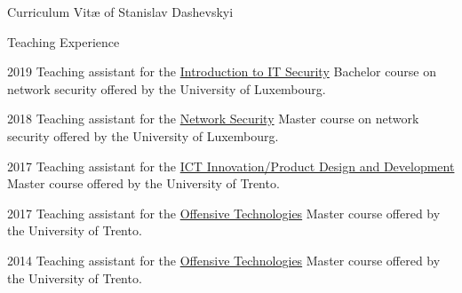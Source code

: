 \documentclass[11pt]{custom-style}
\begin{document}
\begin{cv}{Curriculum Vit\ae{} of Stanislav Dashevskyi}
\begin{cvlist}{Teaching Experience}
       \item[2019] Teaching assistant for the \href{http://satoss.uni.lu/courses/sec-intro/}{Introduction to IT Security}
                Bachelor course on network security offered by the University of Luxembourg.

      \item[2018] Teaching assistant for the \href{http://satoss.uni.lu/courses/networksecurity/}{Network Security}
                Master course on network security offered by the University of Luxembourg.

      \item[2017] Teaching assistant for the \href{https://securitylab.disi.unitn.it/doku.php?id=ict_innovation}{ICT
          Innovation/Product Design and Development} Master course offered by the University of Trento.

      \item[2017] Teaching assistant for the
          \href{http://securitylab.disi.unitn.it/doku.php?id=course_on_offensive_technologies}{Offensive Technologies}
            Master course offered by the University of Trento.

      \item[2014] Teaching assistant for the
          \href{http://securitylab.disi.unitn.it/doku.php?id=course_on_offensive_technologies}{Offensive Technologies}
            Master course offered by the University of Trento.

  \end{cvlist}

\end{cv}
\end{document}
